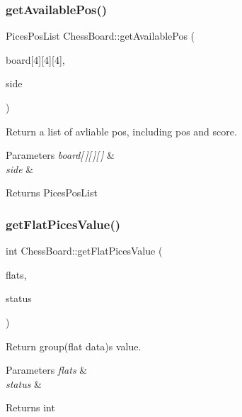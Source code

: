 \subsubsection{\texorpdfstring{get\+Available\+Pos()}{getAvailablePos()}}
{\footnotesize\ttfamily Pices\+Pos\+List Chess\+Board\+::get\+Available\+Pos (\begin{DoxyParamCaption}\item[{int}]{board\mbox{[}4\mbox{]}\mbox{[}4\mbox{]}\mbox{[}4\mbox{]},  }\item[{chess\+Pices\+Status}]{side }\end{DoxyParamCaption})}



Return a list of avliable pos, including pos and score. 


\begin{DoxyParams}{Parameters}
{\em board\mbox{[}$\,$\mbox{]}\mbox{[}$\,$\mbox{]}\mbox{[}$\,$\mbox{]}} & \\
\hline
{\em side} & \\
\hline
\end{DoxyParams}
\begin{DoxyReturn}{Returns}
Pices\+Pos\+List 
\end{DoxyReturn}
\mbox{\label{class_chess_board_a45115518c4f03974c31eb944ac6fa521}} 
\subsubsection{\texorpdfstring{get\+Flat\+Pices\+Value()}{getFlatPicesValue()}}
{\footnotesize\ttfamily int Chess\+Board\+::get\+Flat\+Pices\+Value (\begin{DoxyParamCaption}\item[{Pices\+Flat\+Data\+List}]{flats,  }\item[{chess\+Pices\+Status}]{status }\end{DoxyParamCaption})}



Return group(flat data)\textquotesingle{}s value. 


\begin{DoxyParams}{Parameters}
{\em flats} & \\
\hline
{\em status} & \\
\hline
\end{DoxyParams}
\begin{DoxyReturn}{Returns}
int 
\end{DoxyReturn}
\mbox{\label{class_chess_board_a8208e18ec3b29a039ffe45249d4d9e53}} 
